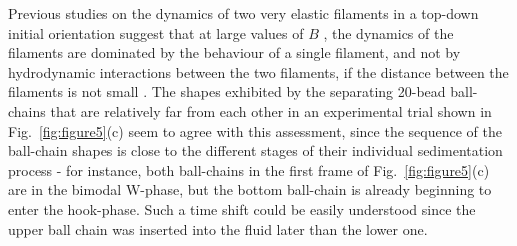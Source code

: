 \documentclass{article}
\begin{document}
Previous studies on the dynamics of two very %
elastic filaments in a top-down initial orientation suggest that at large values of $B$%
, the dynamics of the filaments are dominated by the behaviour of a single filament, and not by hydrodynamic interactions between the two filaments, if the distance between the filaments is not small  \cite{saggiorato2015conformations}. The shapes exhibited by the separating 20-bead ball-chains that are relatively far from each other in an experimental trial shown in Fig.~\ref{fig:figure5}(c) seem to agree with this assessment, since the sequence of the ball-chain shapes is close to the different stages of their individual sedimentation process - for instance, both ball-chains in the first frame of  Fig.~\ref{fig:figure5}(c) are in the bimodal W-phase, but the bottom ball-chain is already beginning to enter the hook-phase. Such a time shift could be easily understood since the upper ball chain was inserted into the fluid later than the lower one. 
\end{document}
